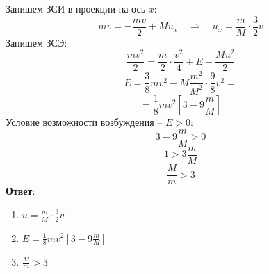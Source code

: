 \documentclass[a5paper,10pt]{article}
\begin{document}
Запишем ЗСИ в проекции на ось $x$:
\begin{equation}
	mv=-\frac{mv}{2}+Mu_x
	\quad\Rightarrow\quad
	u_x=\frac{m}{M}\cdot\frac32v
\end{equation}
Запишем ЗСЭ:
\begin{equation}
	\frac{mv^2}{2}=\frac{m}{2}\cdot\frac{v^2}{4}+E+\frac{Mu^2}{2}
\end{equation}
\begin{equation}
	E=\frac{3}{8}mv^2-M\frac{m^2}{M^2}\cdot\frac98v^2=
\end{equation}
\begin{equation}
	=\frac18mv^2\left[3-9\frac{m}{M}\right]
\end{equation}
Условие возможности возбуждения -- $E>0$:
\begin{equation}
	3-9\frac{m}{M}>0
\end{equation}
\begin{equation}
	1>3\frac{m}{M}
\end{equation}
\begin{equation}
	\frac{M}{m}>3
\end{equation}
\textbf{Ответ}:
\begin{enumerate}
	\item $u=\frac{m}{M}\cdot\frac32v$
	\item $E=\frac18mv^2\left[3-9\frac{m}{M}\right]$
	\item $\frac{M}{m}>3$
\end{enumerate}
\end{document}
